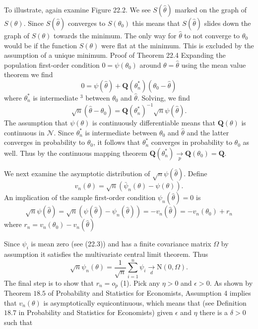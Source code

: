 \documentclass[10pt]{article}
\begin{document}
To illustrate, again examine Figure 22.2. We see $S(\widehat{\theta})$ marked on the graph of $S(\theta)$. Since $S(\widehat{\theta})$ converges to $S\left(\theta_{0}\right)$ this means that $S(\hat{\theta})$ slides down the graph of $S(\theta)$ towards the minimum. The only way for $\widehat{\theta}$ to not converge to $\theta_{0}$ would be if the function $S(\theta)$ were flat at the minimum. This is excluded by the assumption of a unique minimum. Proof of Theorem 22.4 Expanding the population first-order condition $0=\psi\left(\theta_{0}\right)$ around $\theta=\widehat{\theta}$ using the mean value theorem we find
$$
0=\psi(\widehat{\theta})+\boldsymbol{Q}\left(\theta_{n}^{*}\right)\left(\theta_{0}-\widehat{\theta}\right)
$$
where $\theta_{n}^{*}$ is intermediate ${ }^{3}$ between $\theta_{0}$ and $\widehat{\theta}$. Solving, we find
$$
\sqrt{n}\left(\widehat{\theta}-\theta_{0}\right)=\boldsymbol{Q}\left(\theta_{n}^{*}\right)^{-1} \sqrt{n} \psi(\widehat{\theta}) .
$$
The assumption that $\psi(\theta)$ is continuously differentiable means that $\boldsymbol{Q}(\theta)$ is continuous in $\mathscr{N}$. Since $\theta_{n}^{*}$ is intermediate between $\theta_{0}$ and $\widehat{\theta}$ and the latter converges in probability to $\theta_{0}$, it follows that $\theta_{n}^{*}$ converges in probability to $\theta_{0}$ as well. Thus by the continuous mapping theorem $\boldsymbol{Q}\left(\theta_{n}^{*}\right) \underset{p}{\longrightarrow} \boldsymbol{Q}\left(\theta_{0}\right)=\boldsymbol{Q}$.

We next examine the asymptotic distribution of $\sqrt{n} \psi(\widehat{\theta})$. Define
$$
v_{n}(\theta)=\sqrt{n}\left(\bar{\psi}_{n}(\theta)-\psi(\theta)\right) .
$$
An implication of the sample first-order condition $\psi_{n}(\widehat{\theta})=0$ is
$$
\sqrt{n} \psi(\widehat{\theta})=\sqrt{n}\left(\psi(\widehat{\theta})-\psi_{n}(\widehat{\theta})\right)=-v_{n}(\widehat{\theta})=-v_{n}\left(\theta_{0}\right)+r_{n}
$$
where $r_{n}=v_{n}\left(\theta_{0}\right)-v_{n}(\widehat{\theta})$

Since $\psi_{i}$ is mean zero (see (22.3)) and has a finite covariance matrix $\Omega$ by assumption it satisfies the multivariate central limit theorem. Thus
$$
\sqrt{n} \psi_{n}(\theta)=\frac{1}{\sqrt{n}} \sum_{i=1}^{n} \psi_{i} \underset{d}{\longrightarrow} \mathrm{N}(0, \Omega) .
$$
The final step is to show that $r_{n}=o_{p}$ (1). Pick any $\eta>0$ and $\epsilon>0$. As shown by Theorem $18.5$ of Probability and Statistics for Economists, Assumption 4 implies that $v_{n}(\theta)$ is asymptotically equicontinuous, which means that (see Definition $18.7$ in Probability and Statistics for Economists) given $\epsilon$ and $\eta$ there is a $\delta>0$ such that
\end{document}
